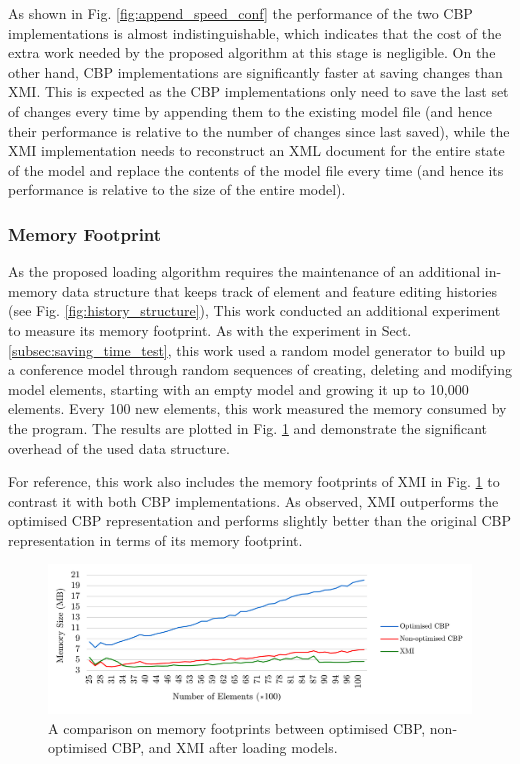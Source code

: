 \documentclass[12pt, a4paper]{report} \usepackage[titletoc]{appendix}
\begin{document}
As shown in Fig. \ref{fig:append_speed_conf} the performance of the two CBP implementations is almost indistinguishable, which indicates that the cost of the extra work needed by the proposed algorithm at this stage is negligible. On the other hand, CBP implementations are significantly faster at saving changes than XMI. This is expected as the CBP implementations only need to save the last set of changes every time by appending them to the existing model file (and hence their performance is relative to the number of changes since last saved), while the XMI implementation needs to reconstruct an XML document for the entire state of the model and replace the contents of the model file every time (and hence its performance is relative to the size of the entire model). 

\subsubsection{Memory Footprint}
\label{subsec:memory_consumption}
As the proposed loading algorithm requires the maintenance of an additional in-memory data structure that keeps track of element and feature editing histories (see Fig. \ref{fig:history_structure}), This work conducted an additional experiment to measure its memory footprint. As with the experiment in Sect. \ref{subsec:saving_time_test}, this work used a random model generator to build up a conference model through random sequences of creating, deleting and modifying model elements, starting with an empty model and growing it up to 10,000 elements. Every 100 new elements, this work measured the memory consumed by the program. The results are plotted in Fig. \ref{fig:memory_ocbp_cbp_xmi} and demonstrate the significant overhead of the used data structure.

For reference, this work also includes the memory footprints of XMI in Fig. \ref{fig:memory_ocbp_cbp_xmi} to contrast it with both CBP implementations. As observed, XMI outperforms the optimised CBP representation and performs slightly better than the original CBP representation in terms of its memory footprint. 

\begin{figure}[H]	
	\centering
	\includegraphics[width=\linewidth]{memory_ocbp_cbp_xmi}
	\caption{A comparison on memory footprints between optimised CBP, non-optimised CBP, and XMI after loading models.}\label{fig:memory_ocbp_cbp_xmi}
\end{figure}
\end{document}

